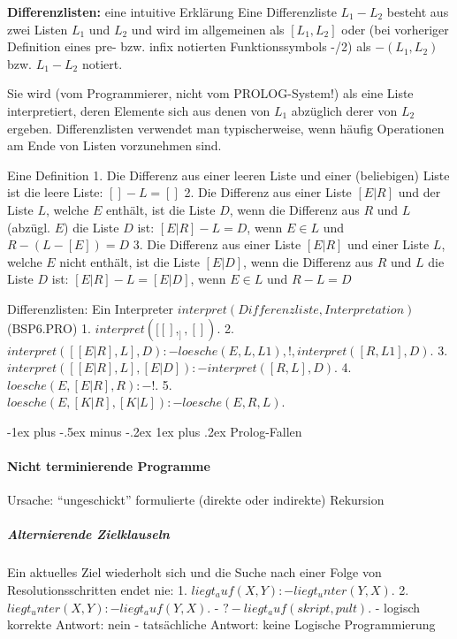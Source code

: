 \documentclass[a4paper]{article}
\makeatletter
\renewcommand{\subsubsection}{\@startsection{subsubsection}{3}{0mm}%
                {-1ex plus -.5ex minus -.2ex}%
                {1ex plus .2ex}%
                {\normalfont\small\bfseries}}
\makeatother
\begin{document}
\begin{multicols}{3}
  \textbf{Differenzlisten:} eine intuitive Erklärung Eine Differenzliste
  $L_1 - L_2$ besteht aus zwei Listen $L_1$ und $L_2$ und wird im
  allgemeinen als $[L_1,L_2]$ oder (bei vorheriger Definition eines pre-
  bzw. infix notierten Funktionssymbols -/2) als $-(L_1,L_2)$ bzw.
  $L_1-L_2$ notiert.

  Sie wird (vom Programmierer, nicht vom PROLOG-System!) als eine Liste
  interpretiert, deren Elemente sich aus denen von $L_1$ abzüglich derer
  von $L_2$ ergeben. Differenzlisten verwendet man typischerweise, wenn
  häufig Operationen am Ende von Listen vorzunehmen sind.

  Eine Definition 1. Die Differenz aus einer leeren Liste und einer
  (beliebigen) Liste ist die leere Liste: $[] - L = []$ 2. Die Differenz
  aus einer Liste $[E|R]$ und der Liste $L$, welche $E$ enthält, ist die
  Liste $D$, wenn die Differenz aus $R$ und $L$ (abzügl. $E$) die Liste
  $D$ ist: $[E|R]-L = D$, wenn $E\in L$ und $R-(L-[E]) = D$ 3. Die
  Differenz aus einer Liste $[E|R]$ und einer Liste $L$, welche $E$ nicht
  enthält, ist die Liste $[E|D]$, wenn die Differenz aus $R$ und $L$ die
  Liste $D$ ist: $[E|R] - L = [E|D]$, wenn $E\in L$ und $R-L=D$

  Differenzlisten: Ein Interpreter
  $interpret(Differenzliste,Interpretation)$ (BSP6.PRO) 1.
  $interpret([[],_],[]).$ 2.
  $interpret([[E|R],L] , D ) :- loesche(E , L, L1),! , interpret( [ R , L1 ] , D ).$
  3. $interpret([[E|R],L] , [E|D] ) :- interpret([R,L],D).$ 4.
  $loesche(E, [E|R], R) :-!.$ 5.
  $loesche(E, [K|R], [K|L]) :- loesche(E,R,L).$

  \subsubsection{Prolog-Fallen}\label{prolog-fallen}

  \paragraph{Nicht terminierende
    Programme}\label{nicht-terminierende-programme}

  Ursache: ``ungeschickt'' formulierte (direkte oder indirekte) Rekursion

  \subparagraph{Alternierende
    Zielklauseln}\label{alternierende-zielklauseln}

  Ein aktuelles Ziel wiederholt sich und die Suche nach einer Folge von
  Resolutionsschritten endet nie: 1. $liegt_auf(X,Y) :- liegt_unter(Y,X).$
  2. $liegt_unter(X,Y) :- liegt_auf(Y,X).$ -
  $?- liegt_auf( skript, pult ).$ - logisch korrekte Antwort: nein -
  tatsächliche Antwort: keine Logische Programmierung


\end{multicols}
\end{document}
